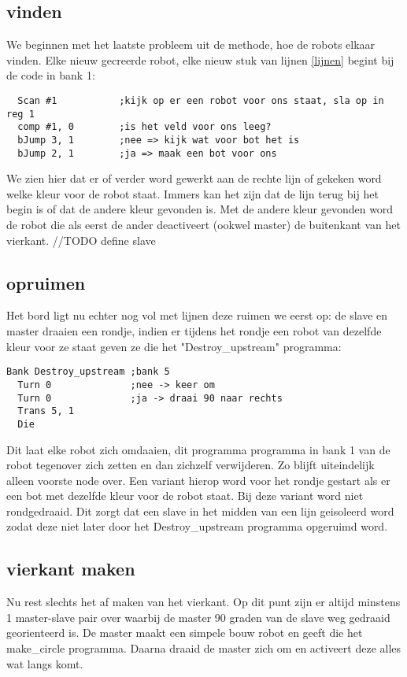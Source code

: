 \documentclass[10pt]{article}
\begin{document}
\subsection{vinden}
We beginnen met het laatste probleem uit de methode, hoe de robots elkaar vinden. Elke nieuw gecreerde robot, elke nieuw stuk van lijnen \ref{lijnen} begint bij de code in bank 1:

\begin{verbatim}
  Scan #1           ;kijk op er een robot voor ons staat, sla op in reg 1
  comp #1, 0        ;is het veld voor ons leeg?
  bJump 3, 1        ;nee => kijk wat voor bot het is
  bJump 2, 1        ;ja => maak een bot voor ons
\end{verbatim}

We zien hier dat er of verder word gewerkt aan de rechte lijn of gekeken word welke kleur voor de robot staat. Immers kan het zijn dat de lijn terug bij het begin is of dat de andere kleur gevonden is. Met de andere kleur gevonden word de robot die als eerst de ander deactiveert (ookwel master) de buitenkant van het vierkant. //TODO define slave

\subsection{opruimen}
Het bord ligt nu echter nog vol met lijnen deze ruimen we eerst op: de slave en master draaien een rondje, indien er tijdens het rondje een robot van dezelfde kleur voor ze staat geven ze die het "Destroy\_upstream" programma:

\begin{verbatim}
Bank Destroy_upstream ;bank 5
  Turn 0              ;nee -> keer om
  Turn 0              ;ja -> draai 90 naar rechts
  Trans 5, 1
  Die
\end{verbatim}

Dit laat elke robot zich omdaaien, dit programma programma in bank 1 van de robot tegenover zich zetten en dan zichzelf verwijderen. Zo blijft uiteindelijk alleen voorste node over. Een variant hierop word voor het rondje gestart als er een bot met dezelfde kleur voor de robot staat. Bij deze variant word niet rondgedraaid. Dit zorgt dat een slave in het midden van een lijn geisoleerd word zodat deze niet later door het Destroy\_upstream programma opgeruimd word.

\subsection{vierkant maken}
Nu rest slechts het af maken van het vierkant. Op dit punt zijn er altijd minstens 1 master-slave pair over waarbij de master 90 graden van de slave weg gedraaid georienteerd is. De master maakt een simpele bouw robot en geeft die het make\_circle programma. Daarna draaid de master zich om en activeert deze alles wat langs komt.
\end{document}
